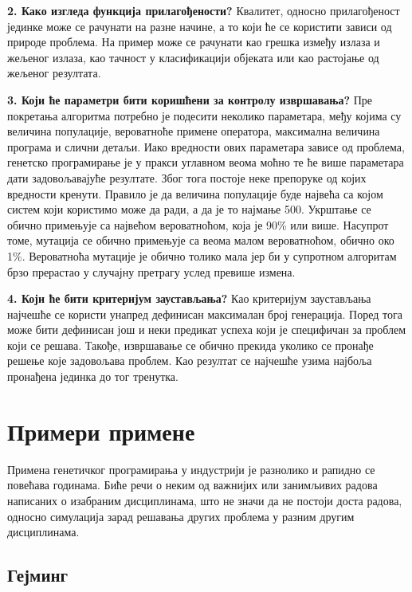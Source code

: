\documentclass[a4paper]{article}
\begin{document}
\textbf{2. Како изгледа функција прилагођености?}\newline
Квалитет, односно прилагођеност јединке може се рачунати на разне начине, а то који ће се користити зависи од природе проблема. На пример може се рачунати као грешка између излаза и жељеног излаза, као тачност у класификацији објеката или као растојање од жељеног резултата.\newline

\textbf{3. Који ће параметри бити коришћени за контролу извршавања?}\newline
Пре покретања алгоритма потребно је подесити неколико параметара, међу којима су величина популације, вероватноће примене оператора, максимална величина програма и слични детаљи. Иако вредности ових параметара зависе од проблема, генетско програмирање је у пракси углавном веома моћно те ће више параметара дати задовољавајуће резултате. Због тога постоје неке препоруке од којих вредности кренути. Правило је да величина популације буде највећа са којом систем који користимо може да ради, а да је то најмање 500. Укрштање се обично примењује са највећом вероватноћом, која је 90\% или више. Насупрот томе, мутација се обично примењује са веома малом вероватноћом, обично око 1\%. Вероватноћа мутације је обично толико мала јер би у супротном алгоритам брзо прерастао у случајну претрагу услед превише измена.\newline

\textbf{4. Који ће бити критеријум заустављања?}\newline
Као критеријум заустављања најчешће се користи унапред дефинисан максималан број генерација. Поред тога може бити дефинисан још и неки предикат успеха који је специфичан за проблем који се решава. Такође, извршавање се обично прекида уколико се пронађе решење које задовољава проблем. Као резултат се најчешће узима најбоља пронађена јединка до тог тренутка. \newline

\section{Примери примене}
Примена генетичког програмирања у индустрији је разнолико и рапидно се повећава годинама. Биће речи о неким од важнијих или занимљивих радова написаних о изабраним дисциплинама, што не значи да не постоји доста радова, односно симулација зарад решавања других проблема у разним другим дисциплинама.
\subsection{Гејминг}
\end{document}
